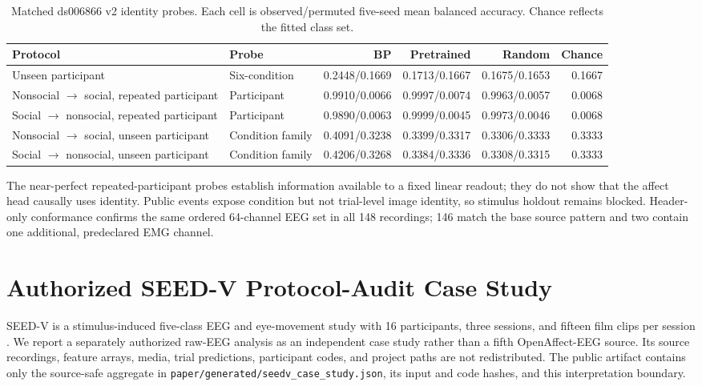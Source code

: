 \begin{table}[t]
  \caption{Matched ds006866 v2 identity probes. Each cell is observed/permuted
  five-seed mean balanced accuracy. Chance reflects the fitted class set.}
  \label{tab:ds006866-v2-probes}
  \centering
  \scriptsize
  \setlength{\tabcolsep}{4pt}
  \begin{tabularx}{\textwidth}{@{}XXrrrr@{}}
    \toprule
    Protocol & Probe & BP & Pretrained & Random & Chance \\
    \midrule
    Unseen participant & Six-condition & 0.2448/0.1669 & 0.1713/0.1667 & 0.1675/0.1653 & 0.1667 \\
    Nonsocial $\rightarrow$ social, repeated participant & Participant & 0.9910/0.0066 & 0.9997/0.0074 & 0.9963/0.0057 & 0.0068 \\
    Social $\rightarrow$ nonsocial, repeated participant & Participant & 0.9890/0.0063 & 0.9999/0.0045 & 0.9973/0.0046 & 0.0068 \\
    Nonsocial $\rightarrow$ social, unseen participant & Condition family & 0.4091/0.3238 & 0.3399/0.3317 & 0.3306/0.3333 & 0.3333 \\
    Social $\rightarrow$ nonsocial, unseen participant & Condition family & 0.4206/0.3268 & 0.3384/0.3336 & 0.3308/0.3315 & 0.3333 \\
    \bottomrule
  \end{tabularx}
\end{table}

The near-perfect repeated-participant probes establish information available
to a fixed linear readout; they do not show that the affect head causally uses
identity. Public events expose condition but not trial-level image identity, so
stimulus holdout remains blocked. Header-only conformance confirms the same
ordered 64-channel EEG set in all 148 recordings; 146 match the base source
pattern and two contain one additional, predeclared EMG channel.

\section{Authorized SEED-V Protocol-Audit Case Study}
\label{app:seedv}

SEED-V is a stimulus-induced five-class EEG and eye-movement study with
16 participants, three sessions, and fifteen film clips per session
\citep{li2019seedv}. We report a separately authorized raw-EEG analysis as an
independent case study rather than a fifth OpenAffect-EEG source. Its source
recordings, feature arrays, media, trial predictions, participant codes, and
project paths are not redistributed. The public artifact contains only the
source-safe aggregate in \texttt{paper/generated/seedv\_case\_study.json},
its input and code hashes, and this interpretation boundary.

